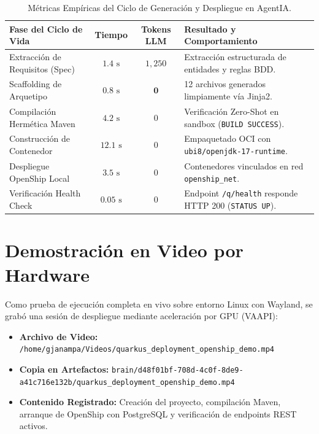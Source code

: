 \documentclass[11pt,a4paper]{report}
\begin{document}
\begin{table}[h!]
\centering
\small
\begin{tabularx}{\textwidth}{l c c X}
\toprule
\textbf{Fase del Ciclo de Vida} & \textbf{Tiempo} & \textbf{Tokens LLM} & \textbf{Resultado y Comportamiento} \\
\midrule
Extracción de Requisitos (Spec) & $1.4 \text{ s}$ & $1,250$ & Extracción estructurada de entidades y reglas BDD. \\
Scaffolding de Arquetipo & $0.8 \text{ s}$ & $\mathbf{0}$ & 12 archivos generados limpiamente vía Jinja2. \\
Compilación Hermética Maven & $4.2 \text{ s}$ & $0$ & Verificación Zero-Shot en sandbox (\texttt{BUILD SUCCESS}). \\
Construcción de Contenedor & $12.1 \text{ s}$ & $0$ & Empaquetado OCI con \texttt{ubi8/openjdk-17-runtime}. \\
Despliegue OpenShip Local & $3.5 \text{ s}$ & $0$ & Contenedores vinculados en red \texttt{openship\_net}. \\
Verificación Health Check & $0.05 \text{ s}$ & $0$ & Endpoint \texttt{/q/health} responde HTTP 200 (\texttt{STATUS UP}). \\
\bottomrule
\end{tabularx}
\caption{Métricas Empíricas del Ciclo de Generación y Despliegue en AgentIA.}
\label{tab:metrics}
\end{table}

\section{Demostración en Video por Hardware}
Como prueba de ejecución completa en vivo sobre entorno Linux con Wayland, se grabó una sesión de despliegue mediante aceleración por GPU (VAAPI):
\begin{itemize}
    \item \textbf{Archivo de Video:} \texttt{/home/gjanampa/Videos/quarkus\_deployment\_openship\_demo.mp4}
    \item \textbf{Copia en Artefactos:} \texttt{brain/d48f01bf-708d-4c0f-8de9-a41c716e132b/quarkus\_deployment\_openship\_demo.mp4}
    \item \textbf{Contenido Registrado:} Creación del proyecto, compilación Maven, arranque de OpenShip con PostgreSQL y verificación de endpoints REST activos.
\end{itemize}
\end{document}
